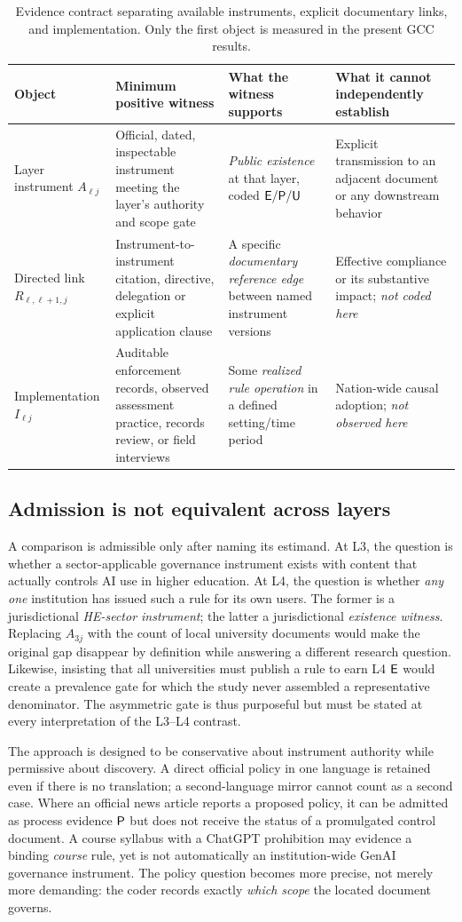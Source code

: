 \begin{table}[t]
\centering\caption{Evidence contract separating available instruments, explicit documentary links, and implementation. Only the first object is measured in the present GCC results.}\label{tab:contract}
\footnotesize
\begin{tabularx}{\textwidth}{@{}p{}p{}p{}X@{}}
\toprule
Object & Minimum positive witness & What the witness supports & What it cannot independently establish\tabularnewline\midrule
Layer instrument $A_{\ell j}$ & Official, dated, inspectable instrument meeting the layer's authority and scope gate & \emph{Public existence} at that layer, coded $\textsf{E}/\textsf{P}/\textsf{U}$ & Explicit transmission to an adjacent document or any downstream behavior\tabularnewline
Directed link $R_{\ell,\ell+1,j}$ & Instrument-to-instrument citation, directive, delegation or explicit application clause & A specific \emph{documentary reference edge} between named instrument versions & Effective compliance or its substantive impact; \emph{not coded here}\tabularnewline
Implementation $I_{\ell j}$ & Auditable enforcement records, observed assessment practice, records review, or field interviews & Some \emph{realized rule operation} in a defined setting/time period & Nation-wide causal adoption; \emph{not observed here}\tabularnewline
\bottomrule
\end{tabularx}
\end{table}

\subsection{Admission is not equivalent across layers}
A comparison is admissible only after naming its estimand. At L3, the question is whether a sector-applicable governance instrument exists with content that actually controls AI use in higher education. At L4, the question is whether \emph{any one} institution has issued such a rule for its own users. The former is a jurisdictional \emph{HE-sector instrument}; the latter a jurisdictional \emph{existence witness}. Replacing $A_{3j}$ with the count of local university documents would make the original gap disappear by definition while answering a different research question. Likewise, insisting that all universities must publish a rule to earn L4 $\textsf{E}$ would create a prevalence gate for which the study never assembled a representative denominator. The asymmetric gate is thus purposeful but must be stated at every interpretation of the L3--L4 contrast.

The approach is designed to be conservative about instrument authority while permissive about discovery. A direct official policy in one language is retained even if there is no translation; a second-language mirror cannot count as a second case. Where an official news article reports a proposed policy, it can be admitted as process evidence $\textsf{P}$ but does not receive the status of a promulgated control document. A course syllabus with a ChatGPT prohibition may evidence a binding \emph{course} rule, yet is not automatically an institution-wide GenAI governance instrument. The policy question becomes more precise, not merely more demanding: the coder records exactly \emph{which scope} the located document governs.
